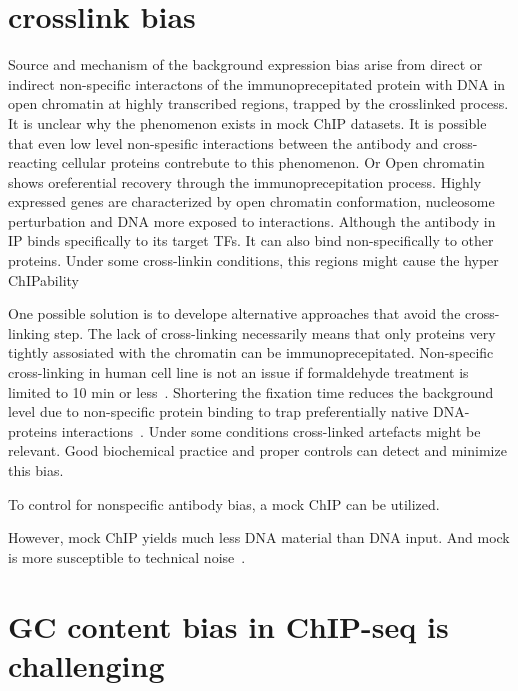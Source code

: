 \section{crosslink bias}

Source and mechanism of the background expression bias arise from direct or indirect non-specific interactons of the immunoprecepitated protein with DNA in  open chromatin at highly transcribed regions, trapped by the crosslinked process.
It is unclear why the phenomenon exists in mock ChIP datasets.
It is possible that even low level non-spesific interactions between the antibody and cross-reacting cellular proteins contrebute to this phenomenon.
Or Open chromatin shows oreferential recovery through the immunoprecepitation process.
Highly expressed genes are characterized by open chromatin conformation, nucleosome perturbation and DNA more exposed to interactions.\cite{}
Although the antibody in IP binds specifically to its target TFs.
It can also bind non-specifically to other proteins.
Under some cross-linkin conditions, this regions might cause the hyper ChIPability\cite{}

One possible solution is to develope alternative approaches that avoid the cross-linking step.
The lack of cross-linking necessarily means that only proteins very tightly assosiated with the chromatin can be immunoprecepitated.
Non-specific cross-linking in human cell line is not an issue if formaldehyde treatment is limited to 10 min or less~\cite{}.
Shortering the fixation time reduces the background level due to non-specific protein binding to trap preferentially native DNA-proteins interactions~\cite{baranello2016chip}.
Under some conditions cross-linked artefacts might be relevant.
Good biochemical practice and proper controls can detect and minimize this bias.

To control for nonspecific antibody bias, a mock ChIP can be utilized.

However, mock ChIP yields much less DNA material than DNA input.
And mock is more susceptible to technical noise~\cite{kidder2011chip, landt2012chip}.

%
\section{GC content bias in ChIP-seq is challenging}

